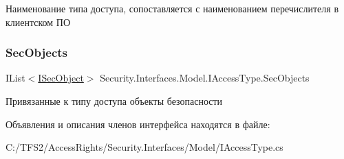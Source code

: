 Наименование типа доступа, сопоставляется с наименованием перечислителя в клиентском ПО 

\mbox{\label{interface_security_1_1_interfaces_1_1_model_1_1_i_access_type_a75b1473ae6aa9a3746aa1ebb3b1d1489}} 
\subsubsection{\texorpdfstring{Sec\+Objects}{SecObjects}}
{\footnotesize\ttfamily I\+List$<$\hyperlink{interface_security_1_1_interfaces_1_1_model_1_1_i_sec_object}{I\+Sec\+Object}$>$ Security.\+Interfaces.\+Model.\+I\+Access\+Type.\+Sec\+Objects\hspace{0.3cm}{\ttfamily [get]}}



Привязанные к типу доступа объекты безопасности 



Объявления и описания членов интерфейса находятся в файле\+:\begin{DoxyCompactItemize}
\item 
C\+:/\+T\+F\+S2/\+Access\+Rights/\+Security.\+Interfaces/\+Model/I\+Access\+Type.\+cs\end{DoxyCompactItemize}
